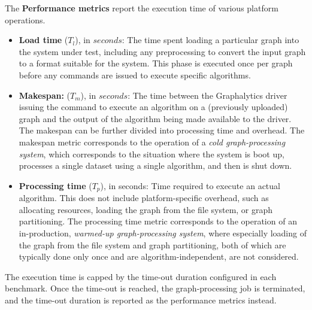 The {\bf Performance metrics} report the execution time of various platform operations.

\begin{itemize}
	\item {\bf Load time} ($T_l$), in $seconds$:  The time spent loading a particular graph into the system under test, including any preprocessing to convert the input graph to a format suitable for the system. This phase is executed once per graph before any commands are issued to execute specific algorithms.
	\item {\bf Makespan:} ($T_m$), in $seconds$: The time between the Graphalytics driver issuing the command to execute an algorithm on a (previously uploaded) graph and the output of the algorithm being made available to the driver. The makespan can be further divided into processing time and overhead. The makespan metric corresponds to the operation of a {\it cold graph-processing system}, which corresponds to the situation where the system is boot up, processes a single dataset using a single algorithm, and then is shut down.
	\item {\bf Processing time} ($T_p$), in seconds: Time required to execute an actual algorithm. This does not include platform-specific overhead, such as allocating resources, loading the graph from the file system, or graph partitioning. The processing time metric corresponds to the operation of an in-production, {\it warmed-up graph-processing system}, where especially loading of the graph from the file system and graph partitioning, both of which are typically done only once and are algorithm-independent, are not considered.
\end{itemize}

The execution time is capped by the time-out duration configured in each benchmark. Once the time-out is reached, the graph-processing job is terminated, and the time-out duration is reported as the performance metrics instead.

